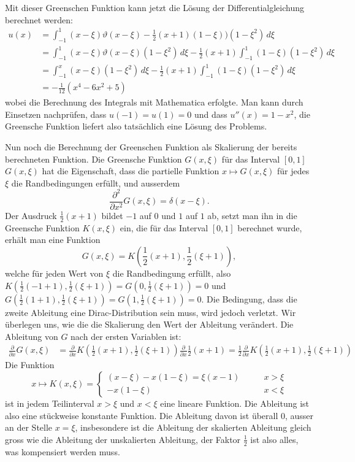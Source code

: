 \begin{loesung}
Mit dieser Greenschen Funktion kann jetzt die Lösung der
Differentialgleichung berechnet werden:
\begin{align*}
u(x)&=\int_{-1}^1
(x-\xi)\vartheta(x-\xi)-{\textstyle\frac12}(x+1)(1-\xi)
)(1-\xi^2)\,d\xi
\\
&=
\int_{-1}^1(x-\xi)\vartheta(x-\xi)(1-\xi^2)\,d\xi
-{\textstyle\frac12}(x+1)\int_{-1}^1(1-\xi)(1-\xi^2)\,d\xi
\\
&=
\int_{-1}^x(x-\xi)(1-\xi^2)\,d\xi
-{\textstyle\frac12}(x+1)\int_{-1}^1(1-\xi)(1-\xi^2)\,d\xi
\\
&=
-\frac1{12}(x^4-6x^2+5)
\end{align*}
wobei die Berechnung des Integrals mit Mathematica erfolgte.
Man kann durch Einsetzen nachprüfen, dass
$u(-1)=u(1)=0$ und dass $u''(x)=1-x^2$, die Greensche Funktion
liefert also tatsächlich eine Lösung des Problems.

Nun noch die Berechnung der Greenschen Funktion als Skalierung
der bereits berechneten Funktion. Die Greensche Funktion $G(x,\xi)$ für
das Interval $[0,1]$
$G(x,\xi)$ hat die Eigenschaft, dass die partielle Funktion
$x\mapsto G(x,\xi)$ für jedes $\xi$ die Randbedingungen erfüllt,
und ausserdem
\[
\frac{\partial^2}{\partial x^2}G(x,\xi)=\delta(x-\xi).
\]
Der Ausdruck $\frac12(x+1)$ bildet $-1$ auf $0$ und $1$ auf $1$
ab, setzt man ihn in die Greensche Funktion $K(x,\xi)$ ein,
die für das Interval $[0,1]$ berechnet wurde,
erhält man eine Funktion
\[
G(x,\xi)=K({\textstyle\frac12}(x+1),{\textstyle\frac12}(\xi+1)),
\]
welche
für jeden Wert von $\xi$ die Randbedingung erfüllt, also
$K(\frac12(-1+1),\frac12(\xi+1))=G(0,\frac12(\xi+1))=0$ und
$G(\frac12(1+1),\frac12(\xi+1))=G(1,\frac12(\xi+1))=0$.
Die Bedingung, dass die zweite Ableitung eine Dirac-Distribution
sein muss, wird jedoch verletzt. Wir überlegen uns, wie die
die Skalierung den Wert der Ableitung verändert.
Die Ableitung von $G$ nach der ersten Variablen ist:
\begin{align*}
\frac{\partial}{\partial x}G(x,\xi)
&=
\frac{\partial}{\partial x}K({\textstyle\frac12}(x+1),{\textstyle\frac12}(\xi+1))\frac{\partial}{\partial x}\frac12(x+1)
=
\frac12\frac{\partial }{\partial x}K({\textstyle \frac12}(x+1), {\textstyle\frac12}(\xi+1))
\end{align*}
Die Funktion
\[
x\mapsto K(x,\xi)=\begin{cases}
(x-\xi)-x(1-\xi)=\xi(x-1)&\qquad x>\xi
\\
-x(1-\xi)&\qquad x<\xi
\end{cases}
\]
ist in jedem Teilinterval $x>\xi$ und $x<\xi$ eine lineare Funktion. Die Ableitung
ist also eine stückweise konstante Funktion.
Die Ableitung davon ist überall $0$, ausser an der Stelle $x=\xi$,
insbesondere ist die Ableitung der skalierten Ableitung gleich gross
wie die Ableitung der unskalierten Ableitung, der Faktor $\frac12$ ist
also alles, was kompensiert werden muss.


\end{loesung}
